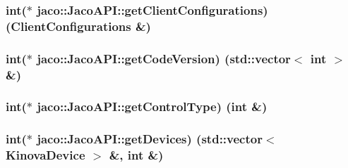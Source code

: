 \subsubsection[{\texorpdfstring{get\+Client\+Configurations}{getClientConfigurations}}]{\setlength{\rightskip}{0pt plus 5cm}int($\ast$ jaco\+::\+Jaco\+A\+P\+I\+::get\+Client\+Configurations) ({\bf Client\+Configurations} \&)}\hypertarget{classjaco_1_1JacoAPI_a215a64d2dee8b2555d317da41e25ae16}{}\label{classjaco_1_1JacoAPI_a215a64d2dee8b2555d317da41e25ae16}
\subsubsection[{\texorpdfstring{get\+Code\+Version}{getCodeVersion}}]{\setlength{\rightskip}{0pt plus 5cm}int($\ast$ jaco\+::\+Jaco\+A\+P\+I\+::get\+Code\+Version) (std\+::vector$<$ int $>$ \&)}\hypertarget{classjaco_1_1JacoAPI_ab2e6426177bd24cd1a381f0f1a9d277a}{}\label{classjaco_1_1JacoAPI_ab2e6426177bd24cd1a381f0f1a9d277a}
\subsubsection[{\texorpdfstring{get\+Control\+Type}{getControlType}}]{\setlength{\rightskip}{0pt plus 5cm}int($\ast$ jaco\+::\+Jaco\+A\+P\+I\+::get\+Control\+Type) (int \&)}\hypertarget{classjaco_1_1JacoAPI_aff9218e13471d4d021f8144738c73ff1}{}\label{classjaco_1_1JacoAPI_aff9218e13471d4d021f8144738c73ff1}
\subsubsection[{\texorpdfstring{get\+Devices}{getDevices}}]{\setlength{\rightskip}{0pt plus 5cm}int($\ast$ jaco\+::\+Jaco\+A\+P\+I\+::get\+Devices) (std\+::vector$<$ {\bf Kinova\+Device} $>$ \&, int \&)}\hypertarget{classjaco_1_1JacoAPI_a6f80ab16b2518ecb0ddefcd7183027c1}{}\label{classjaco_1_1JacoAPI_a6f80ab16b2518ecb0ddefcd7183027c1}

